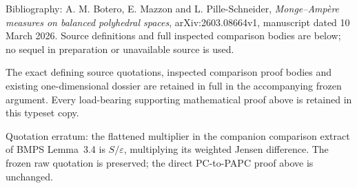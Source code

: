 \documentclass[
  11pt,
]{article}
\begin{document}
Bibliography: A. M. Botero, E. Mazzon and L. Pille-Schneider,
\emph{Monge--Ampère measures on balanced polyhedral spaces},
arXiv:2603.08664v1, manuscript dated 10 March 2026. Source definitions
and full inspected comparison bodies are below; no sequel in preparation
or unavailable source is used.

The exact defining source quotations, inspected comparison proof
bodies and existing one-dimensional dossier are retained in full in the
accompanying frozen argument. Every load-bearing supporting mathematical
proof above is retained in this typeset copy.

Quotation erratum: the flattened multiplier in the companion comparison
extract of BMPS Lemma~3.4 is \(S/\varepsilon\), multiplying its weighted
Jensen difference. The frozen raw quotation is preserved; the direct
PC-to-PAPC proof above is unchanged.
\end{document}
